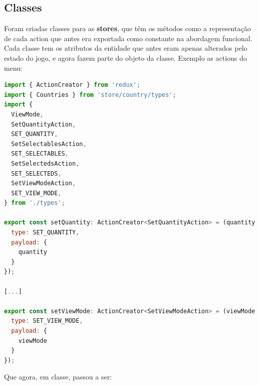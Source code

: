 \documentclass[rel_mlp]{iiufrgs}
\begin{document}
\subsection{Classes}
Foram criadas classes para as \textbf{stores}, que têm os métodos como a representação de cada action que antes era exportada como constante na abordagem funcional. Cada classe tem os atributos da entidade que antes eram apenas alterados pelo estado do jogo, e agora fazem parte do objeto da classe. Exemplo as actions do menu:
\begin{lstlisting}[language=JavaScript]
import { ActionCreator } from 'redux';
import { Countries } from 'store/country/types';
import {
  ViewMode,
  SetQuantityAction,
  SET_QUANTITY,
  SetSelectablesAction,
  SET_SELECTABLES,
  SetSelectedsAction,
  SET_SELECTEDS,
  SetViewModeAction,
  SET_VIEW_MODE,
} from './types';

export const setQuantity: ActionCreator<SetQuantityAction> = (quantity: number) => ({
  type: SET_QUANTITY,
  payload: {
    quantity
  }
});

[...]

export const setViewMode: ActionCreator<SetViewModeAction> = (viewMode: ViewMode) => ({
  type: SET_VIEW_MODE,
  payload: {
    viewMode
  }
});
\end{lstlisting}

Que agora, em classe, passou a ser:
\end{document}

